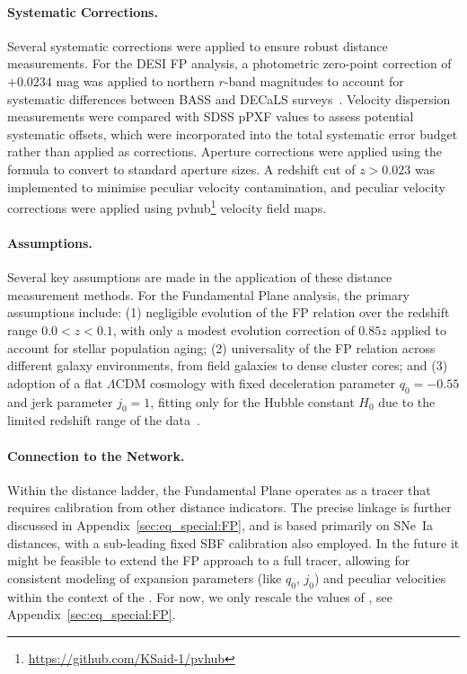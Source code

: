 \paragraph{Systematic Corrections.}
Several systematic corrections were applied to ensure robust distance measurements. For the DESI FP analysis, a photometric zero-point correction of $+0.0234$ mag was applied to northern $r$-band magnitudes to account for systematic differences between BASS and DECaLS surveys~\citep{2025MNRAS.539.3627S}. Velocity dispersion measurements were compared with SDSS pPXF values to assess potential systematic offsets, which were incorporated into the total systematic error budget rather than applied as corrections. Aperture corrections were applied using the~\citet{1995MNRAS.276.1341J} formula to convert to standard aperture sizes. A redshift cut of $z > 0.023$ was implemented to minimise peculiar velocity contamination, and peculiar velocity corrections were applied using  pvhub\footnote{\url{https://github.com/KSaid-1/pvhub}} velocity field maps. 

\paragraph{Assumptions.}
Several key assumptions are made in the application of these distance measurement methods. For the Fundamental Plane analysis, the primary assumptions include: (1) negligible evolution of the FP relation over the redshift range $0.0 < z < 0.1$, with only a modest evolution correction of $0.85z$ applied to account for stellar population aging; (2) universality of the FP relation across different galaxy environments, from field galaxies to dense cluster cores; and (3) adoption of a flat $\Lambda$CDM cosmology with fixed deceleration parameter $q_0 = -0.55$ and jerk parameter $j_0 = 1$, fitting only for the Hubble constant $H_0$ due to the limited redshift range of the data~\citep{2025MNRAS.539.3627S}. 

\paragraph{Connection to the Network.}
Within the distance ladder, the Fundamental Plane operates as a tracer that requires calibration from other distance indicators. The precise linkage is further discussed in Appendix~\ref{sec:eq_special:FP}, and is based primarily on SNe~Ia distances, with a sub-leading fixed SBF calibration also employed.  In the future it might be feasible to extend the FP approach to a full tracer, allowing for consistent modeling of expansion parameters (like $q_0$, $j_0$) and peculiar velocities within the context of the {\DN}. For now, we only rescale the {\Hcst} values of \citet{2025MNRAS.539.3627S,2025ApJ...979L...9S}, see Appendix~\ref{sec:eq_special:FP}.

